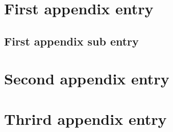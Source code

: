 \section{First appendix entry}

\subsection{First appendix sub entry}

\section{Second appendix entry}

\section{Thrird appendix entry}
